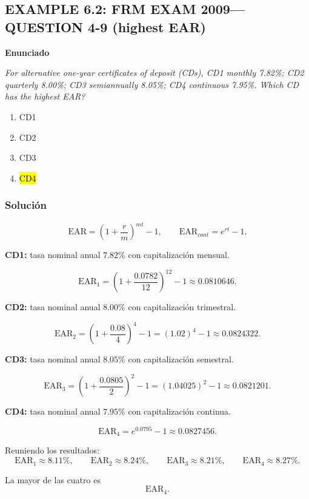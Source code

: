 ﻿\subsection{EXAMPLE 6.2: FRM EXAM 2009---QUESTION 4-9 (highest EAR)}

\textbf{Enunciado}

\emph{For alternative one-year certificates of deposit
(CDs), CD1 monthly 7.82\%; CD2 quarterly 8.00\%; CD3 semiannually 8.05\%; CD4 continuous 7.95\%. Which CD has the highest EAR?}
\begin{enumerate}[label=\alph*.]
\item CD1
\item CD2
\item CD3
\item \hl{CD4}
\end{enumerate}

\subsubsection*{Solución}


\[
\mathrm{EAR}=\left(1+\frac{r}{m}\right)^{mt}-1,\qquad \mathrm{EAR}_{cont}=e^{rt}-1.
\]







\textbf{CD1:} tasa nominal anual \(7.82\%\) con capitalización mensual.

\[
\mathrm{EAR}_1=
\left(1+\frac{0.0782}{12}\right)^{12}-1
\approx 0.0810646.
\]

\textbf{CD2:} tasa nominal anual \(8.00\%\) con capitalización trimestral.

\[
\mathrm{EAR}_2=
\left(1+\frac{0.08}{4}\right)^4-1
=
(1.02)^4-1
\approx 0.0824322.
\]


\textbf{CD3:} tasa nominal anual \(8.05\%\) con capitalización semestral.


\[
\mathrm{EAR}_3=
\left(1+\frac{0.0805}{2}\right)^2-1
=
(1.04025)^2-1
\approx 0.0821201.
\]


\textbf{CD4:} tasa nominal anual \(7.95\%\) con capitalización continua.

\[
\mathrm{EAR}_4=e^{0.0795}-1\approx 0.0827456.
\]



Reuniendo los resultados:
\[
\mathrm{EAR}_1\approx 8.11\%,\qquad
\mathrm{EAR}_2\approx 8.24\%,\qquad
\mathrm{EAR}_3\approx 8.21\%,\qquad
\mathrm{EAR}_4\approx 8.27\%.
\]

La mayor de las cuatro es
\[
\mathrm{EAR}_4.
\]
